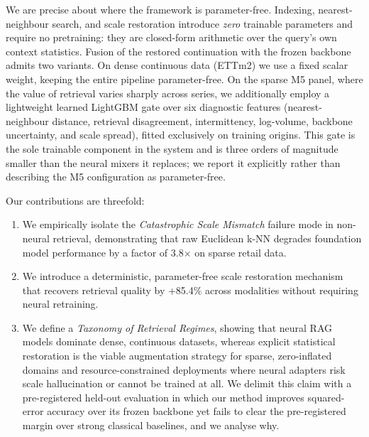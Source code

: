 We are precise about where the framework is parameter-free. Indexing, nearest-neighbour search, and scale restoration introduce \emph{zero} trainable parameters and require no pretraining: they are closed-form arithmetic over the query's own context statistics. Fusion of the restored continuation with the frozen backbone admits two variants. On dense continuous data (ETTm2) we use a fixed scalar weight, keeping the entire pipeline parameter-free. On the sparse M5 panel, where the value of retrieval varies sharply across series, we additionally employ a lightweight learned LightGBM gate over six diagnostic features (nearest-neighbour distance, retrieval disagreement, intermittency, log-volume, backbone uncertainty, and scale spread), fitted exclusively on training origins. This gate is the sole trainable component in the system and is three orders of magnitude smaller than the neural mixers it replaces; we report it explicitly rather than describing the M5 configuration as parameter-free.

Our contributions are threefold:
\begin{enumerate}
    \item We empirically isolate the \textit{Catastrophic Scale Mismatch} failure mode in non-neural retrieval, demonstrating that raw Euclidean k-NN degrades foundation model performance by a factor of 3.8$\times$ on sparse retail data.
    \item We introduce a deterministic, parameter-free scale restoration mechanism that recovers retrieval quality by +85.4\% across modalities without requiring neural retraining.
    \item We define a \textit{Taxonomy of Retrieval Regimes}, showing that neural RAG models dominate dense, continuous datasets, whereas explicit statistical restoration is the viable augmentation strategy for sparse, zero-inflated domains and resource-constrained deployments where neural adapters risk scale hallucination or cannot be trained at all. We delimit this claim with a pre-registered held-out evaluation in which our method improves squared-error accuracy over its frozen backbone yet fails to clear the pre-registered margin over strong classical baselines, and we analyse why.
\end{enumerate}
